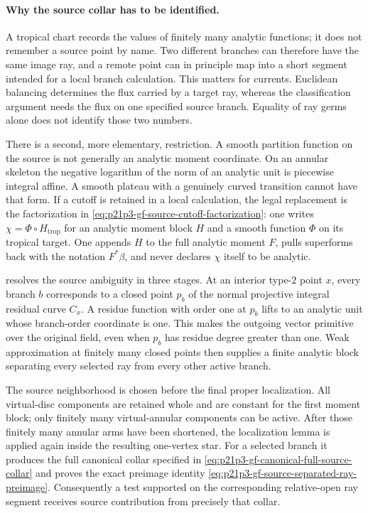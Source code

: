 
\paragraph{Why the source collar has to be identified.}
A tropical chart records the values of finitely many analytic functions; it
does not remember a source point by name.  Two different branches can
therefore have the same image ray, and a remote point can in principle map
into a short segment intended for a local branch calculation.  This matters
for currents.  Euclidean balancing determines the flux carried by a target
ray, whereas the classification argument needs the flux on one specified
source branch.  Equality of ray germs alone does not identify those two
numbers.

There is a second, more elementary, restriction.  A smooth partition
function on the source is not generally an analytic moment coordinate.  On
an annular skeleton the negative logarithm of the norm of an analytic unit
is piecewise integral affine.  A smooth plateau with a genuinely curved
transition cannot have that form.  If a cutoff is retained in a local
calculation, the legal replacement is the factorization in
\eqref{eq:p21p3-gf-source-cutoff-factorization}: one writes
\(\chi=\Phi\circ H_{\mathrm{trop}}\) for an analytic moment block \(H\)
and a smooth function \(\Phi\) on its tropical target.  One appends \(H\)
to the full analytic moment \(F\), pulls superforms back with the notation
\(F^*\beta\), and never declares \(\chi\) itself to be analytic.

 resolves the source ambiguity
in three stages.  At an interior type-\(2\) point \(x\), every branch \(b\)
corresponds to a closed point \(p_b\) of the normal projective integral
residual curve \(C_x\).  A residue function with order one at \(p_b\) lifts
to an analytic unit whose branch-order coordinate is one.  This makes the
outgoing vector primitive over the original field, even when \(p_b\) has
residue degree greater than one.  Weak approximation at finitely many closed
points then supplies a finite analytic block separating every selected ray
from every other active branch.

The source neighborhood is chosen before the final proper localization.  All
virtual-disc components are retained whole and are constant for the first
moment block; only finitely many virtual-annular components can be active.
After those finitely many annular arms have been shortened, the localization
lemma is applied again inside the resulting one-vertex star.  For a selected
branch it produces the full canonical collar specified in
\eqref{eq:p21p3-gf-canonical-full-source-collar} and proves the exact
preimage identity
\eqref{eq:p21p3-gf-source-separated-ray-preimage}.  Consequently a test
supported on the corresponding relative-open ray segment receives source
contribution from precisely that collar.

